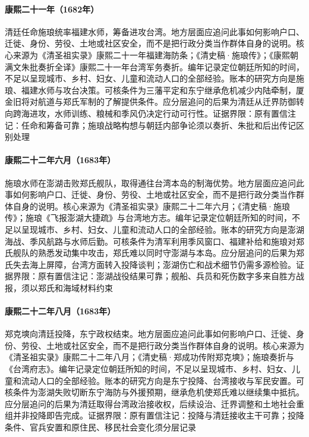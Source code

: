 \hypertarget{social:EQ-1682-SHI-LANG}{}\paragraph{康熙二十一年（1682年）}清廷任命施琅统率福建水师，筹备进攻台湾。地方层面应追问此事如何影响户口、迁徙、身份、劳役、土地或社区安全，而不是把行政分类当作群体自身的说明。核心来源为《清圣祖实录》康熙二十一年福建海防条；《清史稿·施琅传》；《康熙朝满文朱批奏折全译》康熙二十一年台湾军务奏折。编年记录定位朝廷所知的时间，不足以呈现城市、乡村、妇女、儿童和流动人口的全部经验。账本的研究方向是施琅、福建水师与攻台决策。可核条件为三藩平定和东宁继承危机减少内陆牵制，厦金旧将对航道与郑氏军制的了解提供条件。应分层追问的后果为清廷从迁界防御转向跨海进攻，水师训练、粮械和季风仍决定行动可行性。证据界限：原有置信注记：任命和筹备可靠；施琅战略构想与朝廷内部争论须以奏折、朱批和后出传记区别处理
\hypertarget{social:EQ-1683-PENGHU}{}\paragraph{康熙二十二年六月（1683年）}施琅水师在澎湖击败郑氏舰队，取得通往台湾本岛的制海优势。地方层面应追问此事如何影响户口、迁徙、身份、劳役、土地或社区安全，而不是把行政分类当作群体自身的说明。核心来源为《清圣祖实录》康熙二十二年六月；《清史稿·施琅传》；施琅《飞报澎湖大捷疏》与台湾地方志。编年记录定位朝廷所知的时间，不足以呈现城市、乡村、妇女、儿童和流动人口的全部经验。账本的研究方向是澎湖海战、季风航路与水师后勤。可核条件为清军利用季风窗口、福建补给和施琅对郑氏舰队的熟悉发动集中攻击，郑氏难以同时守澎湖与本岛。应分层追问的后果为郑氏失去海上屏障，台湾方面转入投降谈判；澎湖伤亡和战术细节仍需多源检验。证据界限：原有置信注记：澎湖战役结果可靠；舰船、兵员和死伤数字多来自胜方战报，须以郑氏和海域材料约束
\hypertarget{social:EQ-1683-TAIWAN-SURRENDER}{}\paragraph{康熙二十二年八月（1683年）}郑克塽向清廷投降，东宁政权结束。地方层面应追问此事如何影响户口、迁徙、身份、劳役、土地或社区安全，而不是把行政分类当作群体自身的说明。核心来源为《清圣祖实录》康熙二十二年八月；《清史稿·郑成功传附郑克塽》；施琅奏折与《台湾府志》。编年记录定位朝廷所知的时间，不足以呈现城市、乡村、妇女、儿童和流动人口的全部经验。账本的研究方向是东宁投降、台湾接收与军民安置。可核条件为澎湖失败切断东宁海防与外援预期，继承危机使郑氏难以继续集中抵抗。应分层追问的后果为清廷取得台湾政治接收权，后续设治、迁界调整和土地社会重组并非投降即告完成。证据界限：原有置信注记：投降与清廷接收主干可靠；投降条件、官兵安置和原住民、移民社会变化须分层记录
